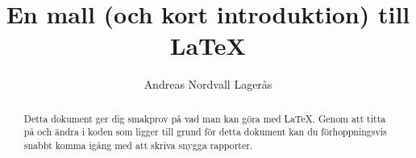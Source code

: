 \documentclass[11pt,a4paper]{article}
\title{En mall (och kort introduktion) till \LaTeX}\author{Andreas Nordvall Lagerås}
\begin{document}

\maketitle       %

\begin{abstract}
	Detta dokument ger dig smakprov på vad man kan göra med \LaTeX. Genom att titta på och ändra i koden som ligger till grund för detta dokument kan du förhoppningsvis snabbt komma igång med att skriva snygga rapporter.
\end{abstract}
\end{document}
